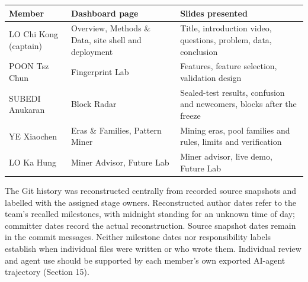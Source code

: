 \documentclass[
  11pt,
  a4paper,
]{article}
\newenvironment{reporttable}{\par\small\sffamily}{\par}
\begin{document}
\begin{reporttable}

\begin{longtable}[]{@{}
  >{\raggedright\arraybackslash}p{}
  >{\raggedright\arraybackslash}p{}
  >{\raggedright\arraybackslash}p{}@{}}
\toprule\noalign{}
\begin{minipage}[b]{\linewidth}\raggedright
\textbf{Member}
\end{minipage} & \begin{minipage}[b]{\linewidth}\raggedright
\textbf{Dashboard page}
\end{minipage} & \begin{minipage}[b]{\linewidth}\raggedright
\textbf{Slides presented}
\end{minipage} \\
\midrule\noalign{}
\endhead
\bottomrule\noalign{}
\endlastfoot
LO Chi Kong (captain) & Overview, Methods \& Data, site shell and
deployment & Title, introduction video, questions, problem, data,
conclusion \\
POON Tsz Chun & Fingerprint Lab & Features, feature selection,
validation design \\
SUBEDI Anukaran & Block Radar & Sealed-test results, confusion and
newcomers, blocks after the freeze \\
YE Xiaochen & Eras \& Families, Pattern Miner & Mining eras, pool
families and rules, limits and verification \\
LO Ka Hung & Miner Advisor, Future Lab & Miner advisor, live demo,
Future Lab \\
\end{longtable}

\end{reporttable}

The Git history was reconstructed centrally from recorded source
snapshots and labelled with the assigned stage owners. Reconstructed
author dates refer to the team's recalled milestones, with midnight
standing for an unknown time of day; committer dates record the actual
reconstruction. Source snapshot dates remain in the commit messages.
Neither milestone dates nor responsibility labels establish when
individual files were written or who wrote them. Individual review and
agent use should be supported by each member's own exported AI-agent
trajectory (Section 15).

\clearpage
\end{document}
